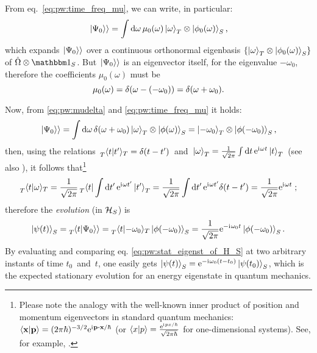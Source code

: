 From eq.~\eqref{eq:pw:time_freq_mu}, we can write, in particular:
\begin{equation}
  \left.\left| \Psi_0 \right\rangle\right\rangle =
    \int \dd{\omega} \mu_0(\omega) \ket{\omega}_{T} \otimes \ket{\phi_0(\omega)}_{S} \text{,}
\end{equation}
which expands $\left.\left| \Psi_0 \right\rangle\right\rangle$ over a continuous orthonormal eigenbasis
$\left\{\ket{\omega}_{T} \otimes \ket{\phi_0(\omega)}_{S}\right\}$
of $\op{\Omega} \ox \idop_S$.
But $\left.\left| \Psi_0 \right\rangle\right\rangle$ is an eigenvector itself,
for the eigenvalue $-\omega_0$,
therefore the coefficients $\mu_0(\omega)$ must be
\begin{equation}\label{eq:pw:mudelta}
  \mu_0(\omega) = \delta\qty(\omega - \qty(-\omega_0) ) = \delta\qty(\omega + \omega_0) \text{.}
\end{equation}

Now, from \eqref{eq:pw:mudelta} and \eqref{eq:pw:time_freq_mu} it holds:
\[
  \left.\left| \Psi_0 \right\rangle\right\rangle = \int \dd{\omega} \delta(\omega + \omega_0) \ket{\omega}_T \otimes \ket{\phi(\omega)}_S =
    \ket{-\omega_0}_T \otimes \ket{\phi(-\omega_0)}_S \text{,}
\]
then, using the relations
$
\, \prescript{}{T}{\braket{t}{t'}}_T = \delta(t-t') \,
$
and
$
  \,
  \ket{\omega}_T =
  \frac{1}{\sqrt{2\pi}} \int\dd{t}\mathrm{e}^{\mathrm{i}\mkern1mu\omega t}\ket{t}_T
  \,
$
(see also \cite[2]{Lloyd:Time}),
it follows that\footnote{%
  Please note the analogy with the well-known
  inner product of position and momentum eigenvectors in standard quantum mechanics:
  $\braket{\vb{x}}{\vb{p}} = (2\pi\hbar)^{-3/2}\E^{\iu \vb{p} \vdot \vb{x}  / \hbar}$
  (or $\braket{x}{p} = \frac{\mathrm{e}^{\mathrm{i}\mkern1mu p x / \hbar}}{\sqrt{2\pi\hbar}}$ for one-dimensional systems).
  See, for example, \cite[126--127]{Ballentine}.
}
\[
  \prescript{}{T}{\braket{t}{\omega}}_T =
  \frac{1}{\sqrt{2\pi}}\prescript{}{T}{\bra{t}} \int\dd{t'}\mathrm{e}^{\mathrm{i}\mkern1mu\omega t'}\ket{t'}_T  =
  \frac{1}{\sqrt{2\pi}}\int\dd{t'}\mathrm{e}^{\mathrm{i}\mkern1mu\omega t'}\delta(t-t') =
  \frac{1}{\sqrt{2\pi}} \mathrm{e}^{\mathrm{i}\mkern1mu\omega t} \; \text{;}
\]
therefore the \emph{evolution} (in $\mathcal{H}_S$) is
\begin{equation}
  \ket{\psi(t)}_S = \prescript{}{T}{\!\left.\left\langle t \middle| \Psi_0 \right\rangle\right\rangle} = \prescript{}{T}{\braket{t}{-\omega_0}}_{T} \ket{\phi(-\omega_0)}_S =
    \frac{1}{\sqrt{2\pi}} \mathrm{e}^{-\mathrm{i}\mkern1mu\omega_0 t} \ket{\phi(-\omega_0)}_S \text{.}
\label{eq:pw:stat_eigenst_of_H_S}
\end{equation}
By evaluating and comparing eq. \eqref{eq:pw:stat_eigenst_of_H_S} at two arbitrary instants of time
$t_0$~and~$t$,
one easily gets
$\ket{\psi(t)}_{S} = \mathrm{e}^{-\mathrm{i}\mkern1mu\omega_{0}(t-t_{0})} \ket{\psi(t_0)}_{S}$,
which is the expected stationary evolution for an energy eigenstate in quantum mechanics. 

